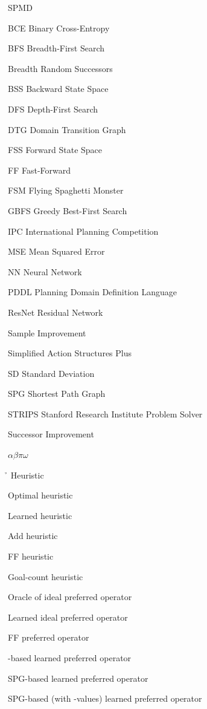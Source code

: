 \documentclass[ppgc,diss,english]{iiufrgs}
\newcommand{\pp}[2][noinline]{\todo[color=purple!50,linecolor={purple!100},#1,fancyline,author=Pedro]{#2}}
\begin{document}
\begin{listofabbrv}{SPMD}
        \item[BCE] Binary Cross-Entropy
        \item[BFS] Breadth-First Search
        \item[\bfsrs] Breadth Random Successors \pp{Need a cooler name.}
        \item[BSS] Backward State Space
        \item[DFS] Depth-First Search
        \item[DTG] Domain Transition Graph
        \item[FSS] Forward State Space
        \item[FF] Fast-Forward
        \item[FSM] Flying Spaghetti Monster
        \item[GBFS] Greedy Best-First Search
        \item[IPC] International Planning Competition
        \item[MSE] Mean Squared Error
        \item[NN]  Neural Network
        \item[PDDL] Planning Domain Definition Language
        \item[ResNet] Residual Network
        \item[\sai] Sample Improvement
        \item[\sas] Simplified Action Structures Plus
        \item[SD] Standard Deviation
        \item[SPG] Shortest Path Graph
        \item[STRIPS] Stanford Research Institute Problem Solver
        \item[\sui] Successor Improvement
\end{listofabbrv}

\begin{listofsymbols}{$\alpha\beta\pi\omega$}
       \item[\h] Heuristic
       \item[\hstar] Optimal heuristic
       \item[\hnn] Learned heuristic
       \item[\hadd] Add heuristic
       \item[\hff] FF heuristic
       \item[\hgc] Goal-count heuristic
       \item[\postartable] Oracle of ideal preferred operator
       \item[\postar] Learned ideal preferred operator
       \item[\poff] FF preferred operator
       \item[\pofsm] \bfsrw-based learned preferred operator
       \item[\pog] SPG-based learned preferred operator
       \item[\pogstar] SPG-based (with \hstar-values) learned preferred operator
\end{listofsymbols}
\end{document}

